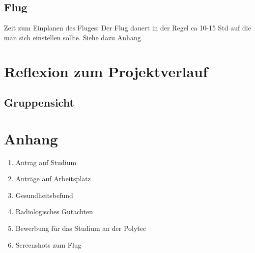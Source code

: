 \documentclass[11pt]{article}
\begin{document}
\subsection{Flug}
Zeit zum Einplanen des Fluges: Der Flug dauert in der Regel ca 10-15 Std auf die man sich einstellen sollte.
Siehe dazu Anhang

\section{Reflexion zum Projektverlauf}

\subsection{Gruppensicht}
\section{Anhang}
\begin{enumerate}
\item Antrag auf Studium
\item Anträge auf Arbeitsplatz
\item Gesundheitsbefund
\item Radiologisches Gutachten
\item Bewerbung für das Studium an der Polytec
\item Screenshots zum Flug
\end{enumerate}
\end{document}
